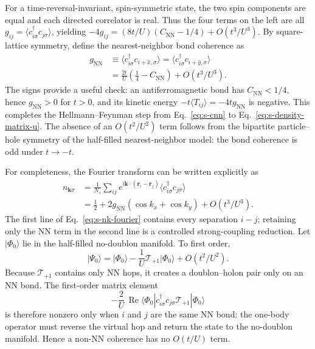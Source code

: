 \documentclass[10pt]{article}
\newcommand{\Cnn}{C_{\mathrm{NN}}}
\begin{document}
For a time-reversal-invariant, spin-symmetric state, the two spin components
are equal and each directed correlator is real.  Thus the four terms on the
left are all
$g_{ij}=\langle c^\dagger_{i\sigma}c_{j\sigma}\rangle$, yielding
$-4g_{ij}=(8t/U)(\Cnn-1/4)+O(t^3/U^3)$.  By square-lattice
symmetry, define the nearest-neighbor bond coherence as
\begin{equation}
\begin{aligned}
g_{\mathrm{NN}}
&\equiv\langle c^\dagger_{i\sigma}c_{i+\hat x,\sigma}\rangle
=\langle c^\dagger_{i\sigma}c_{i+\hat y,\sigma}\rangle\\
&=\frac{2t}{U}\left(\frac14-\Cnn\right)+O(t^3/U^3).
\end{aligned}
\label{eq:s-density-matrix-u}
\end{equation}
The signs provide a useful check: an antiferromagnetic bond has
$\Cnn<1/4$, hence $g_{\mathrm{NN}}>0$ for $t>0$, and its kinetic energy
$-t\langle T_{ij}\rangle=-4tg_{\mathrm{NN}}$ is negative.  This completes the
Hellmann--Feynman step from Eq.~\ref{eq:s-cnn} to
Eq.~\ref{eq:s-density-matrix-u}.
The absence of an $O(t^2/U^2)$ term follows from the bipartite
particle--hole symmetry of the half-filled nearest-neighbor model: the bond
coherence is odd under $t\to-t$.

For completeness, the Fourier transform can be written explicitly as
\begin{equation}
\begin{aligned}
n_{\mathbf k\sigma}
&=\frac{1}{N_s}\sum_{ij}e^{i\mathbf k\cdot(\mathbf r_i-\mathbf r_j)}
  \langle c^\dagger_{i\sigma}c_{j\sigma}\rangle\\
&=\frac12+2g_{\mathrm{NN}}(\cos k_x+\cos k_y)+O(t^3/U^3).
\end{aligned}
\label{eq:s-nk-fourier}
\end{equation}
The first line of Eq.~\ref{eq:s-nk-fourier} contains every separation
$i-j$; retaining only the NN term in the second line is a controlled
strong-coupling reduction.  Let $|\Phi_0\rangle$ lie in the half-filled
no-doublon manifold.  To first order,
\[
 |\Psi_0\rangle=|\Phi_0\rangle
 -\frac{1}{U}\mathcal T_{+1}|\Phi_0\rangle+O(t^2/U^2).
\]
Because $\mathcal T_{+1}$ contains only NN hops, it creates a doublon--holon
pair only on an NN bond.  The first-order matrix element
\[
 -\frac{2}{U}\,\operatorname{Re}
 \langle\Phi_0|c^\dagger_{i\sigma}c_{j\sigma}
 \mathcal T_{+1}|\Phi_0\rangle
\]
is therefore nonzero only when $i$ and $j$ are the same NN bond: the
one-body operator must reverse the virtual hop and return the state to the
no-doublon manifold.  Hence a non-NN coherence has no $O(t/U)$ term.
\end{document}
